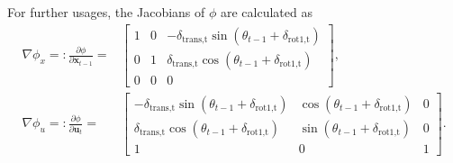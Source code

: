 For further usages, the Jacobians of $\phi$ are calculated as
\begin{align}
    \nabla\phi_x =: \frac{\partial\phi}{\partial \mathbf{x}_{t-1}} =
     & \begin{bmatrix}
        1 & 0 & -\delta_{\text{trans,t}}\sin(\theta_{t-1} + \delta_{\text{rot1,t}}) \\
        0 & 1 & \delta_{\text{trans,t}}\cos(\theta_{t-1} + \delta_{\text{rot1,t}})  \\
        0 & 0 & 0
    \end{bmatrix}, \\
    \nabla\phi_u =: \frac{\partial\phi}{\partial \mathbf{u}_{t}} =
     & \begin{bmatrix}
        -\delta_{\text{trans,t}}\sin(\theta_{t-1} + \delta_{\text{rot1,t}}) & \cos(\theta_{t-1} + \delta_{\text{rot1,t}}) & 0 \\
        \delta_{\text{trans,t}}\cos(\theta_{t-1} + \delta_{\text{rot1,t}})  & \sin(\theta_{t-1} + \delta_{\text{rot1,t}}) & 0 \\
        1                                                                   & 0                                           & 1
    \end{bmatrix}.
\end{align}
